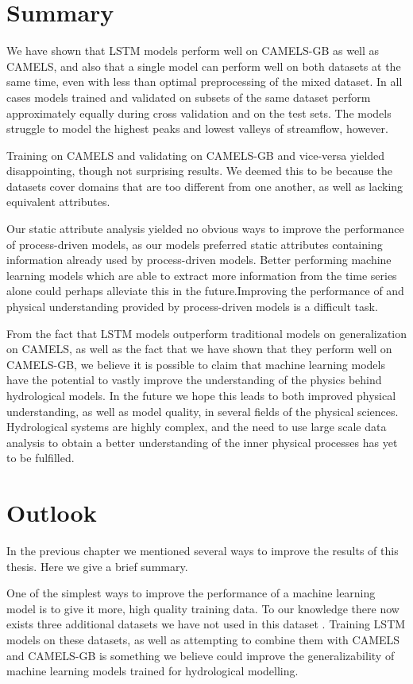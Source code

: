 \section{Summary}
We have shown that LSTM models perform well on CAMELS-GB as well as CAMELS, and 
also that a single model can perform well on both datasets at the same time, even 
with less than optimal preprocessing of the mixed dataset.
In all cases models trained and validated on subsets of the same dataset perform 
approximately equally during cross validation and on the test sets. 
The models struggle to model the highest peaks and lowest valleys of streamflow, 
however. 

Training on CAMELS and validating on CAMELS-GB and vice-versa yielded disappointing, 
though not surprising results. We deemed this to be because the datasets cover 
domains that are too different from one another, as well as lacking equivalent 
attributes.

Our static attribute analysis yielded no obvious ways to improve the performance 
of process-driven models, as our models preferred static attributes containing 
information already used by process-driven models. Better performing 
machine learning models which are able to extract more information from the time 
series alone could perhaps alleviate this in the future.Improving the performance of and 
physical understanding provided by process-driven models is a difficult task.

From the fact that LSTM models outperform traditional models on generalization on 
CAMELS, as well as the fact that we have shown that they perform well on CAMELS-GB, 
we believe it is possible to claim that machine learning models have the potential 
to vastly improve the understanding of the physics behind hydrological models. 
In the future we hope this leads to both improved physical understanding, 
as well as model quality, in several fields of the physical sciences. Hydrological 
systems are highly complex, and the need to use large scale data analysis to 
obtain a better understanding of the inner physical processes has yet to be 
fulfilled. 

\section{Outlook}
In the previous chapter we mentioned several ways to improve the results of this 
thesis. Here we give a brief summary.

One of the simplest ways to improve the performance of a machine learning model is to give 
it more, high quality training data. To our knowledge there now exists three 
additional datasets we have not used in this dataset \citep{CAMELS_CL, CAMELS_AU, CAMELS_BR}.
Training LSTM models on these datasets, as well as attempting to combine them with 
CAMELS and CAMELS-GB is something we believe could improve the generalizability of 
machine learning models trained for hydrological modelling.

